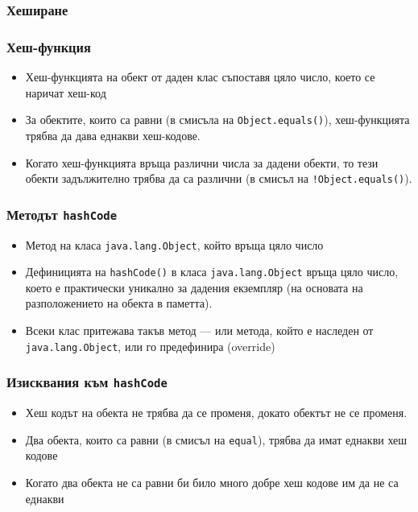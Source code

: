\documentclass[ignorenonframetext, hyperref=unicode,compress]{beamer}
\begin{document}
\begin{frame}[containsverbatim]\frametitle{Хеширане}
\begin{figure}[h]
\center
{}
\end{figure}
\end{frame}


\begin{frame}[containsverbatim]\frametitle{Хеш-функция}
\begin{itemize}
 \item Хеш-функцията на обект от даден клас съпоставя цяло число, което се наричат хеш-код
 \item За обектите, които са равни (в смисъла на \lstinline{Object.equals()}), хеш-функцията трябва да дава еднакви хеш-кодове.
 \item Когато хеш-функцията връща различни числа за дадени обекти, то тези обекти задължително трябва да са различни (в смисъл на \lstinline{!Object.equals()}).
\end{itemize}
\end{frame}

\begin{frame}[containsverbatim]\frametitle{Методът \lstinline{hashCode}}
\begin{itemize}
 \item Метод на класа \lstinline{java.lang.Object}, който връща цяло число
 \item Дефиницията на \lstinline{hashCode()} в класа \lstinline{java.lang.Object} връща цяло число, което е практически уникално за дадения екземпляр (на основата на разположението на обекта в паметта).
 \item Всеки клас притежава такъв метод --- или метода, който е наследен от \lstinline{java.lang.Object}, или го предефинира (override)
\end{itemize}
\end{frame}

\begin{frame}[containsverbatim]\frametitle{Изисквания към \lstinline{hashCode}}
\begin{itemize}
 \item Хеш кодът на обекта не трябва да се променя, докато обектът не се променя.
 \item Два обекта, които са равни (в смисъл на \lstinline{equal}), трябва да имат еднакви хеш кодове
 \item Когато два обекта не са равни би било много добре хеш кодове им да не са еднакви
\end{itemize}
\end{frame}
\end{document}
